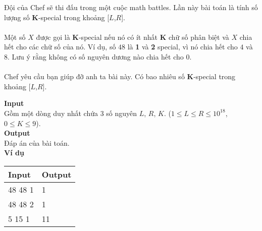 Đội của Chef sẽ thi đấu trong một cuộc math battles. Lần này bài toán là tính số lượng số \textbf{K}-special trong khoảng [$L$,$R$].
\\
\\
Một số $X$ được gọi là \textbf{K}-special nếu nó có ít nhất \textbf{K} chữ số phân biệt và $X$ chia hết cho các chữ số của nó. Ví dụ, số $48$ là \textbf{1} và \textbf{2} special, vì nó chia hết cho $4$ và $8$. Lưu ý rằng không có số nguyên dương nào chia hết cho $0$.
\\
\\
Chef yêu cầu bạn giúp đỡ anh ta bài này. Có bao nhiêu số \textbf{K}-special trong khoảng [$L$,$R$]. 

\textbf{Input}
\\
Gồm một dòng duy nhất chứa 3 số nguyên $L$, $R$, $K$. ($1 \leq L \leq R \leq 10^{18}$, $0 \leq K \leq 9$).
\\

\textbf{Output}
\\
Đáp án của bài toán.
\\

\textbf{Ví dụ}
\begin{table}[h!]
    \begin{center}
        \begin{tabular}{|p{6cm}|p{6cm}|}
            \hline
            \textbf{Input} & \textbf{Output} \\ 
            \hline
            48 48 1 & 1 \\
            \hline
            48 48 2 & 1 \\
            \hline 
            5 15 1 & 11 \\
            \hline
        \end{tabular}
    \end{center}
\end{table}



